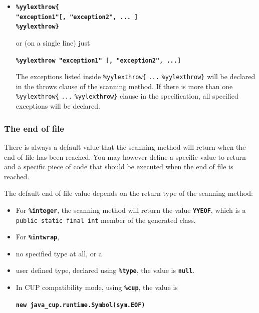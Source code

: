 \documentclass[11pt]{scrartcl}
\begin{document}
\begin{itemize}
\item
{\bf \verb+%yylexthrow{+}\\
{\bf \texttt{"exception1"[, "exception2", ... ]}}\\
{\bf \verb+%yylexthrow}+}

or (on a single line) just

{\bf \texttt{\%yylexthrow "exception1" [,  "exception2", ...]}}

The exceptions listed inside \verb+%yylexthrow{+ \texttt{...} \verb+%yylexthrow}+ 
will be declared in the throws clause of the scanning method. If there is
more than one \verb+%yylexthrow{+ \texttt{...} \verb+%yylexthrow}+ clause in
the specification, all specified exceptions will be declared.
\end{itemize}

\subsubsection{The end of file\label{EOF}}
There is always a default value that the scanning method will return when
the end of file has been reached. You may however define a specific value
to return and a specific piece of code that should be executed when the
end of file is reached.

The default end of file value depends on the return type of the scanning method:
\begin{itemize}
\item
For {\bf \texttt{\%integer}}, the scanning method will return the value
{\bf \texttt{YYEOF}}, which is a \texttt{public static final int} member
of the generated class.

\item
For {\bf \texttt{\%intwrap}}, 
\item
no specified type at all, or a 
\item
user defined type, declared using {\bf \texttt{\%type}}, the value is {\bf \texttt{null}}.

\item
In CUP compatibility mode, using {\bf \texttt{\%cup}}, the value is 

{\bf \texttt{new java\_cup.runtime.Symbol(sym.EOF)}}
\end{itemize}
\end{document}
